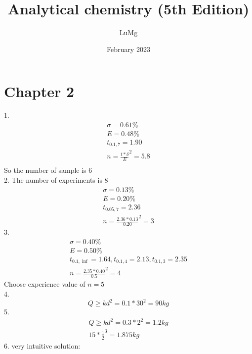 \documentclass{article}
\title{Analytical chemistry (5th Edition)}
\author{LuMg}
\date{February 2023}
\begin{document}
\maketitle

\section{Chapter 2}
1.\begin{equation}
    \begin{multlined}
    \sigma = 0.61\%\\
    E = 0.48\%\\
    t_{0.1,7} = 1.90\\
    n = \frac{t*\delta}{E}^2 = 5.8\\
    \end{multlined}
\end{equation}
So the number of sample is 6\\
2. The number of experiments is 8\\
\begin{equation}
    \begin{multlined}
        \sigma = 0.13\%\\
        E = 0.20\%\\
        t_{0.05,7} = 2.36\\
        n = \frac{2.36*0.13}{0.20}^2 = 3
    \end{multlined}
\end{equation}
3.\begin{equation}
    \begin{multlined}
        \sigma = 0.40\%\\
        E = 0.50\%\\
        t_{0.1,\inf} = 1.64, t_{0.1,4} = 2.13, t_{0.1,3} = 2.35\\
        n = \frac{2.35*0.40}{0.5}^2 = 4
    \end{multlined}
\end{equation}
Choose experience value of $n = 5$\\
4.\begin{equation}
    Q \geq kd^2 = 0.1*30^2 = 90kg
\end{equation}
5.\begin{equation}
    \begin{multlined}
        Q\geq kd^2 = 0.3*2^2 = 1.2kg\\
        15*\frac{1}{2}^3 = 1.875kg
    \end{multlined}
\end{equation}
6. very intuitive solution:\\
\end{document}
